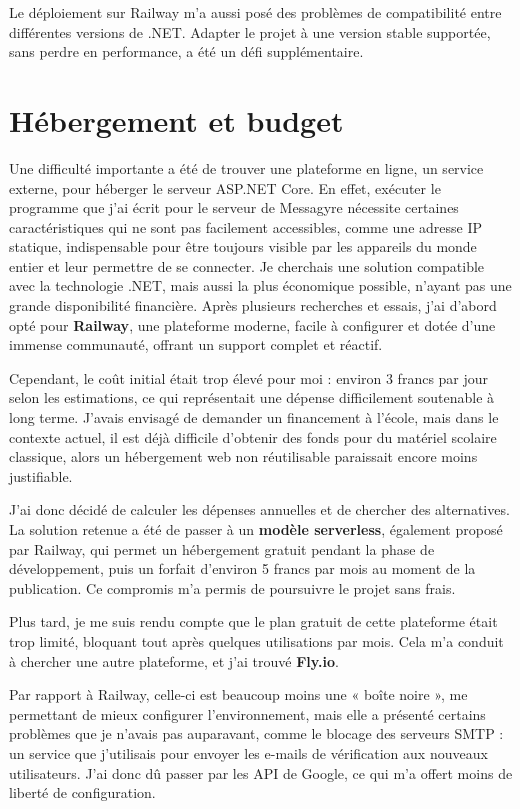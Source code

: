 \documentclass[12pt]{report}
\begin{document}
	Le déploiement sur Railway m’a aussi posé des problèmes de compatibilité entre différentes versions de .NET. Adapter le projet à une version stable supportée, sans perdre en performance, a été un défi supplémentaire.
	
	\section{Hébergement et budget}
	\label{hostingandbudget}
	
	Une difficulté importante a été de trouver une plateforme en ligne, un service externe, pour héberger le serveur ASP.NET Core. En effet, exécuter le programme que j’ai écrit pour le serveur de Messagyre nécessite certaines caractéristiques qui ne sont pas facilement accessibles, comme une adresse IP statique, indispensable pour être toujours visible par les appareils du monde entier et leur permettre de se connecter. Je cherchais une solution compatible avec la technologie .NET, mais aussi la plus économique possible, n’ayant pas une grande disponibilité financière. Après plusieurs recherches et essais, j’ai d’abord opté pour \textbf{Railway}, une plateforme moderne, facile à configurer et dotée d’une immense communauté, offrant un support complet et réactif.
	
	Cependant, le coût initial était trop élevé pour moi : environ 3 francs par jour selon les estimations, ce qui représentait une dépense difficilement soutenable à long terme. J’avais envisagé de demander un financement à l’école, mais dans le contexte actuel, il est déjà difficile d’obtenir des fonds pour du matériel scolaire classique, alors un hébergement web non réutilisable paraissait encore moins justifiable.
	
	J’ai donc décidé de calculer les dépenses annuelles et de chercher des alternatives. La solution retenue a été de passer à un \textbf{modèle serverless}, également proposé par Railway, qui permet un hébergement gratuit pendant la phase de développement, puis un forfait d’environ 5 francs par mois au moment de la publication. Ce compromis m’a permis de poursuivre le projet sans frais.
	
	Plus tard, je me suis rendu compte que le plan gratuit de cette plateforme était trop limité, bloquant tout après quelques utilisations par mois. Cela m’a conduit à chercher une autre plateforme, et j’ai trouvé \textbf{Fly.io}.
	
	Par rapport à Railway, celle-ci est beaucoup moins une « boîte noire », me permettant de mieux configurer l’environnement, mais elle a présenté certains problèmes que je n’avais pas auparavant, comme le blocage des serveurs SMTP : un service que j’utilisais pour envoyer les e-mails de vérification aux nouveaux utilisateurs. J’ai donc dû passer par les API de Google, ce qui m’a offert moins de liberté de configuration.
	
\end{document}
